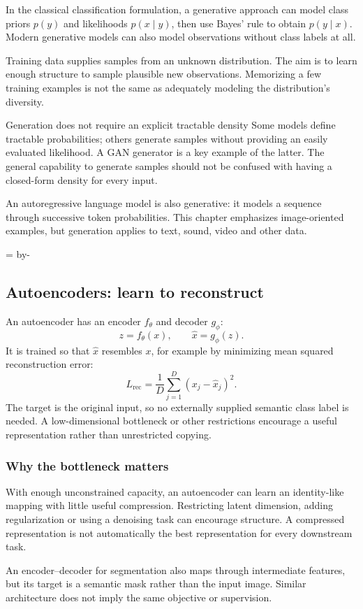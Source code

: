 \documentclass[11pt]{article}
\newcommand{\newsubsection}[1]{\par\begingroup\skip0=\pagegoal\advance\skip0 by-\pagetotal\ifdim\skip0<12\baselineskip\newpage\fi\endgroup\subsection{#1}}
\begin{document}
In the classical classification formulation, a generative approach can model class priors $p(y)$ and likelihoods $p(x\mid y)$, then use Bayes' rule to obtain $p(y\mid x)$. Modern generative models can also model observations without class labels at all.

Training data supplies samples from an unknown distribution. The aim is to learn enough structure to sample plausible new observations. Memorizing a few training examples is not the same as adequately modeling the distribution's diversity.

\begin{keyidea}{Generation does not require an explicit tractable density}
Some models define tractable probabilities; others generate samples without providing an easily evaluated likelihood. A GAN generator is a key example of the latter. The general capability to generate samples should not be confused with having a closed-form density for every input.
\end{keyidea}

An autoregressive language model is also generative: it models a sequence through successive token probabilities. This chapter emphasizes image-oriented examples, but generation applies to text, sound, video and other data.

\newsubsection{Autoencoders: learn to reconstruct}
An autoencoder has an encoder $f_\theta$ and decoder $g_\phi$:
\[
z=f_\theta(x),\qquad \widehat{x}=g_\phi(z).
\]
It is trained so that $\widehat{x}$ resembles $x$, for example by minimizing mean squared reconstruction error:
\[
L_{\mathrm{rec}}=\frac1D\sum_{j=1}^{D}(x_j-\widehat{x}_j)^2.
\]
The target is the original input, so no externally supplied semantic class label is needed. A low-dimensional bottleneck or other restrictions encourage a useful representation rather than unrestricted copying.

\subsubsection{Why the bottleneck matters}
With enough unconstrained capacity, an autoencoder can learn an identity-like mapping with little useful compression. Restricting latent dimension, adding regularization or using a denoising task can encourage structure. A compressed representation is not automatically the best representation for every downstream task.

An encoder--decoder for segmentation also maps through intermediate features, but its target is a semantic mask rather than the input image. Similar architecture does not imply the same objective or supervision.
\end{document}
